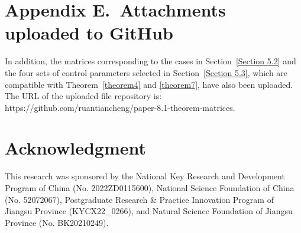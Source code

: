\documentclass[journal]{IEEEtran}
\begin{document}
\section*{Appendix E.~Attachments uploaded to GitHub}
\label{AppendixE}

In addition, the matrices corresponding to the cases in Section~\ref{Section 5.2} and the four sets of control parameters selected in Section~\ref{Section 5.3}, which are compatible with Theorem~\ref{theorem4} and \ref{theorem7}, have also been uploaded. The URL of the uploaded file repository is:
https://github.com/ruantiancheng/paper-8.1-theorem-matrices.




\section*{Acknowledgment}


This research was sponsored by the National Key Research and Development Program of China (No. 2022ZD0115600),
 National Science Foundation of China (No. 52072067), Postgraduate Research \& Practice Innovation Program of Jiangsu Province (KYCX22\_0266), and Natural Science Foundation of Jiangsu Province (No. BK20210249).


\ifCLASSOPTIONcaptionsoff
 \newpage
\fi




\end{document}
